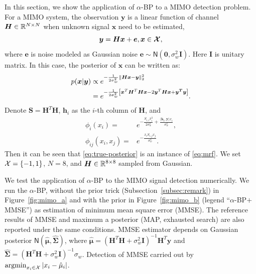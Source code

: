 In this section, we show the application of $\alpha$-BP to a MIMO detection problem. For a MIMO system, the observation $\bm{y}$ is a linear function of channel $\bm{H}\in \mathbb{R}^{N\times N}$ when unknown signal $\bm{x}$ need to be estimated,
\begin{equation}\label{eq:linear-model}
  \bm{y} = \bm{H} \bm{x} + \bm{e}, \bm{x} \in \bm{\mathcal{X}},
\end{equation}
where $\bm{e}$ is  noise modeled as Gaussian noise $ \bm{e} \sim \mathsf{N}\left( \bm{0}, \sigma^2_{w} \bm{I} \right)$. Here $\bm{I}$ is unitary matrix. In this case, the posterior of $\bm{x}$ can be written as:
\begin{align}\label{eq:true-posterior}
  p(\bm{x}|\bm{y}) &\propto e^{ - \frac{1}{2\sigma_w^2} \| \bm{Hx} - \bm{y} \|_{2}^2 } \nonumber \\
                   & = e^{ - \frac{1}{2\sigma_w^2}\left[ \bm{x}^{T}\bm{H}^{T}\bm{H}\bm{x} - 2 \bm{y}^T\bm{H}\bm{x}  + \bm{y^T}\bm{y}  \right] }.
\end{align}
Denote $\bm{S} = \bm{H}^T\bm{H}$, $\bm{h}_i$ as the $i$-th column of $\bm{H}$, and
\begin{align}
  \phi_{i}(x_i) =& e^{- \frac{S_{i,i} x_i^2}{2 \sigma_w^2} + \frac{\langle {\bm{h}_i, \bm{y}}\rangle x_i}{\sigma_w^2} },\nonumber \\
  \phi_{ij}(x_i, x_j) =& e^{ -\frac{x_i S_{i,j} x_j}{\sigma_w^2} }.
\end{align}
Then it can be seen that \eqref{eq:true-posterior} is an instance of \eqref{eq:mrf}. We set $\mathcal{X} = \left\{ -1, 1 \right\}$, $N = 8$, and $\bm{H}\in \mathbb{R}^{8 \times 8}$ sampled from Gaussian.

We test the application of $\alpha$-BP to the MIMO signal detection numerically. We run the $\alpha$-BP, without the prior trick (Subsection~\ref{subsec:remark}) in Figure~\ref{fig:mimo_a} and with the prior in Figure~\ref{fig:mimo_b} (legend ``$\alpha$-BP$+$MMSE'') as estimation of minimum mean square error (MMSE). The reference results of MMSE and maximum a posterior (MAP, exhausted search) are also reported under the same conditions. MMSE estimator depends on Gaussian posterior $\mathsf{N}(\hat{\bm{\mu}}, \hat{\bm{\Sigma}})$, where $\hat{\bm{\mu}} = (\bm{H}^{T}\bm{H} + \sigma_w^2 \bm{I})^{-1}\bm{H}^{T}\bm{y}$ and $\hat{\bm{\Sigma}} = (\bm{H}^{T}\bm{H} + \sigma_w^2 \bm{I})^{-1}\sigma_w$. Detection of MMSE carried out by $\operatorname{argmin}_{x_i\in \mathcal{X}}| x_i-\hat{\mu}_i |$.%

